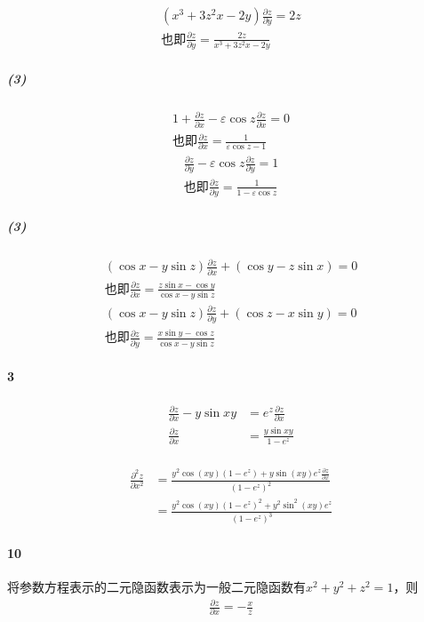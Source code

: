 \documentclass[UTF8]{ctexart}
\begin{document}
    \begin{align*}
        (x^3 + 3z^2x-2y) \frac{\partial z}{\partial y} =
        2z\\
        \text{也即} \frac{\partial z}{\partial y} = 
        \frac{2z}{x^3 + 3z^2x-2y} 
    \end{align*}

    \subparagraph*{(3)}
    \begin{align*}
        1 +  \frac{\partial z}{\partial x} - 
        \varepsilon \cos z \frac{\partial z}{\partial x}
        =  0\\
        \text{也即} \frac{\partial z}{\partial x} = 
        \frac{1}{\varepsilon \cos z - 1} 
    \end{align*}
    \begin{align*}
        \frac{\partial z}{\partial y} - 
        \varepsilon \cos z \frac{\partial z}{\partial y}
        =  1\\
        \text{也即} \frac{\partial z}{\partial y} = 
        \frac{1}{1 - \varepsilon \cos z} 
    \end{align*}

    \subparagraph*{(3)}
    \begin{align*}
        (\cos x - y \sin z)\frac{\partial z}{\partial x}
         + (\cos y -z \sin x) = 0 \\
         \text{也即} \frac{\partial z}{\partial x}
         = \frac{z \sin x - \cos y}{\cos x - y \sin z} \\
         (\cos x - y \sin z)\frac{\partial z}{\partial y}
         + (\cos z - x \sin y) = 0 \\
         \text{也即} \frac{\partial z}{\partial y}
         = \frac{x \sin y - \cos z}{\cos x - y \sin z} 
    \end{align*}

    \paragraph*{3}
    \begin{align*}
        \frac{\partial z}{\partial x} - y\sin xy
        &= e^z \frac{\partial z}{\partial x} \\
        \frac{\partial z}{\partial x} &= 
        \frac{y\sin xy}{1-e^z} \\
    \end{align*}
        
    \begin{align*}
        \frac{\partial^2 z}{\partial x^2} &= 
        \frac{y^2 \cos (xy) (1-e^z) +y \sin (xy) e^z \frac{\partial z}{\partial x}}{(1-e^z)^2} \\ 
        &= \frac{y^2 \cos (xy) (1-e^z)^2 +y^2 \sin^2 (xy) e^z }{(1-e^z)^3} 
    \end{align*}

    \paragraph*{10}
    
    将参数方程表示的二元隐函数表示为一般二元隐函数有$x^2 + y^2 + z^2 = 1$，则
    \begin{align*}
        \frac{\partial z}{\partial x} = -\frac{x}{z} 
    \end{align*}
\end{document}
